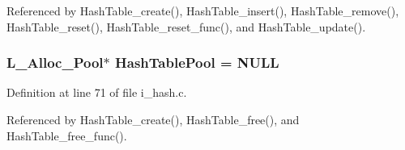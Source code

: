 Referenced by Hash\-Table\_\-create(), Hash\-Table\_\-insert(), Hash\-Table\_\-remove(), Hash\-Table\_\-reset(), Hash\-Table\_\-reset\_\-func(), and Hash\-Table\_\-update().
\subsubsection{\setlength{\rightskip}{0pt plus 5cm}\bf{L\_\-Alloc\_\-Pool}$\ast$ \bf{Hash\-Table\-Pool} = NULL}\label{i__hash_8c_51ba8cadbb11bf5bb3e5e7d12a75ede2}




Definition at line 71 of file i\_\-hash.c.

Referenced by Hash\-Table\_\-create(), Hash\-Table\_\-free(), and Hash\-Table\_\-free\_\-func().